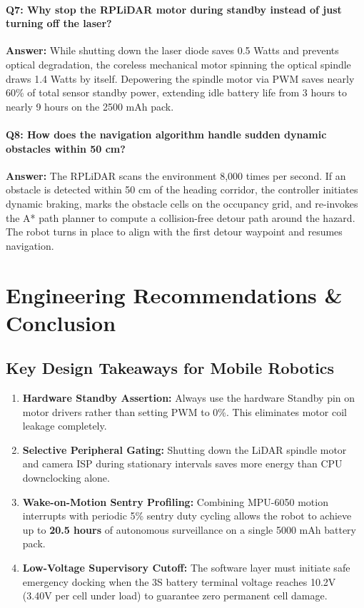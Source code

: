 \documentclass[11pt,a4paper]{article}
\begin{document}
\paragraph{Q7: Why stop the RPLiDAR motor during standby instead of just turning off the laser?}
\textbf{Answer:} While shutting down the laser diode saves 0.5 Watts and prevents optical degradation, the coreless mechanical motor spinning the optical spindle draws 1.4 Watts by itself. Depowering the spindle motor via PWM saves nearly 60\% of total sensor standby power, extending idle battery life from 3 hours to nearly 9 hours on the 2500 mAh pack.

\paragraph{Q8: How does the navigation algorithm handle sudden dynamic obstacles within 50 cm?}
\textbf{Answer:} The RPLiDAR scans the environment 8,000 times per second. If an obstacle is detected within 50 cm of the heading corridor, the controller initiates dynamic braking, marks the obstacle cells on the occupancy grid, and re-invokes the A* path planner to compute a collision-free detour path around the hazard. The robot turns in place to align with the first detour waypoint and resumes navigation.

\newpage

\section{Engineering Recommendations \& Conclusion}

\subsection{Key Design Takeaways for Mobile Robotics}
\begin{enumerate}
    \item \textbf{Hardware Standby Assertion:} Always use the hardware Standby pin on motor drivers rather than setting PWM to 0\%. This eliminates motor coil leakage completely.
    \item \textbf{Selective Peripheral Gating:} Shutting down the LiDAR spindle motor and camera ISP during stationary intervals saves more energy than CPU downclocking alone.
    \item \textbf{Wake-on-Motion Sentry Profiling:} Combining MPU-6050 motion interrupts with periodic 5\% sentry duty cycling allows the robot to achieve up to \textbf{20.5 hours} of autonomous surveillance on a single 5000 mAh battery pack.
    \item \textbf{Low-Voltage Supervisory Cutoff:} The software layer must initiate safe emergency docking when the 3S battery terminal voltage reaches 10.2V (3.40V per cell under load) to guarantee zero permanent cell damage.
\end{enumerate}
\end{document}
